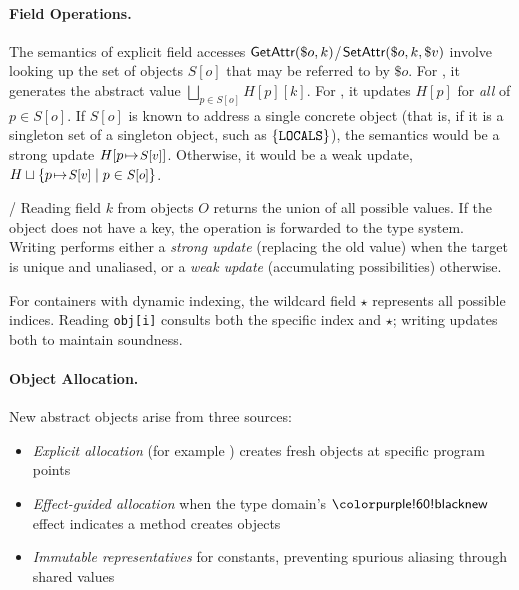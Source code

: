 \paragraph{Field Operations.}
The semantics of explicit field accesses 
$\textsf{GetAttr}(\$o, k)$/$\textsf{SetAttr}(\$o, k, \$v)$
involve looking up the set of objects $S[o]$ that may be
referred to by $\$o$.
For \tGetAttr, it generates the abstract value
$\bigsqcup_{p \in S[o]} H[p][k]$.
For \tSetAttr, it updates $H[p]$ for \emph{all} of $p\in S[o]$.
If $S[o]$ is known to address a single concrete object (that is, if it is a singleton set of a singleton object, such as
$\{\texttt{LOCALS}\}$),
the semantics would be a strong update
$H[p{\hspace{1pt}\mapsto\hspace{1pt}} \mbox{\small $S[v]$}]$.
Otherwise, it would be a weak update,
$H\sqcup\{p{\hspace{1pt}\mapsto\hspace{1pt}} \mbox{\small $S[v]$}\mid p\in \mbox{\small $S[o]$}\}$.

\tGetAttr/\tSetAttr
Reading field $k$ from objects $O$ returns the union of all possible values. If the object does not have a key, the operation is forwarded to the type system. Writing performs either a \emph{strong update} (replacing the old value) when the target is unique and unaliased, or a \emph{weak update} (accumulating possibilities) otherwise.

For containers with dynamic indexing, the wildcard field $\star$ represents all possible indices. Reading \texttt{obj[i]} consults both the specific index and $\star$; writing updates both to maintain soundness.

\paragraph{Object Allocation.}
New abstract objects arise from three sources:
\begin{itemize}
\item \emph{Explicit allocation} (for example \tBind) creates fresh objects at specific program points
\item \emph{Effect-guided allocation} when the type domain's $\tnew$ effect indicates a method creates objects  
\item \emph{Immutable representatives} for constants, preventing spurious aliasing through shared values
\end{itemize}

